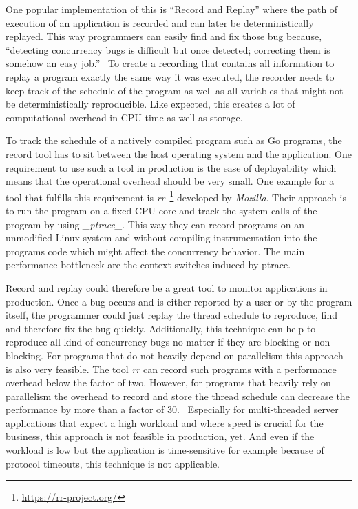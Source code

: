 \documentclass[conference]{IEEEtran}
\begin{document}
One popular implementation of this is ``Record and Replay'' where the path of execution of an application is recorded and can later be deterministically replayed.
This way programmers can easily find and fix those bug because, ``detecting concurrency bugs is difficult but once detected; correcting them is somehow an easy job.''~\cite{tchamgoue2012testing}
To create a recording that contains all information to replay a program exactly the same way it was executed, the recorder needs to keep track of the schedule of the program as well as all variables that might not be deterministically reproducible.
Like expected, this creates a lot of computational overhead in CPU time as well as storage.

To track the schedule of a natively compiled program such as Go programs, the record tool has to sit between the host operating system and the application.
One requirement to use such a tool in production is the ease of deployability which means that the operational overhead should be very small.
One example for a tool that fulfills this requirement is \emph{rr}~\footnote{\url{https://rr-project.org/}} developed by \emph{Mozilla}.
Their approach is to run the program on a fixed CPU core and track the system calls of the program by using \emph{\_ptrace\_}.
This way they can record programs on an unmodified Linux system and without compiling instrumentation into the programs code which might affect the concurrency behavior.
The main performance bottleneck are the context switches induced by ptrace.

Record and replay could therefore be a great tool to monitor applications in production.
Once a bug occurs and is either reported by a user or by the program itself, the programmer could just replay the thread schedule to reproduce, find and therefore fix the bug quickly.
Additionally, this technique can help to reproduce all kind of concurrency bugs no matter if they are blocking or non-blocking.
For programs that do not heavily depend on parallelism this approach is also very feasible.
The tool \emph{rr} can record such programs with a performance overhead below the factor of two.
However, for programs that heavily rely on parallelism the overhead to record and store the thread schedule can decrease the performance by more than a factor of 30.~\cite{o2017engineering}
Especially for multi-threaded server applications that expect a high workload and where speed is crucial for the business, this approach is not feasible in production, yet.
And even if the workload is low but the application is time-sensitive for example because of protocol timeouts, this technique is not applicable.
\end{document}
